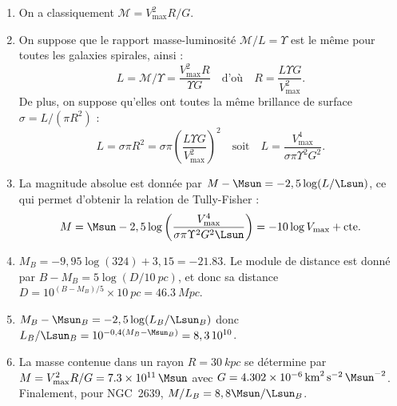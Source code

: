 \documentclass[a4paper,10pt]{report}
\begin{document}
\begin{Answer}
  \begin{enumerate}
  \item On a classiquement $\mathcal{M} = V_{\max}^{2}R/G$.
  \item On suppose que le rapport masse-luminosité $\mathcal{M}/L = \Upsilon$
    est le même pour toutes les galaxies spirales, ainsi :
    $$
    L = \mathcal{M} / \Upsilon = \frac{V_{\max}^{2}R}{\Upsilon G}
    \quad\text{d'où}\quad
    R = \frac{L \Upsilon G}{V_{\max}^{2}}.
    $$
    De plus, on suppose qu’elles ont toutes la même brillance de surface
    $\sigma = L/(\pi R^{2})$ :
    $$
    L = \sigma \pi R^{2} = 
    \sigma \pi \left(\frac{L \Upsilon G}{V_{\max}^{2}}\right)^{2}
    \quad\text{soit}\quad
    L = \frac{V_{\max}^{4}}{\sigma \pi \Upsilon^{2} G^{2}}.
    $$
  \item La magnitude absolue est donnée par $M - \Msun = -2,5\log(L/\Lsun)$, ce
    qui permet d’obtenir la relation de Tully-Fisher :
    $$
    M = \Msun - 2,5\log \left( \frac{V_{\max}^{4}}{\sigma \pi \Upsilon^{2}
        G^{2} \Lsun} \right) = -10\log V_{\max} + \mathrm{cte}.
    $$
  \item $M_{B} = -9,95 \log(324) + 3,15 = -21.83$. Le module de distance est
    donné par $B - M_{B} = 5\log(D/\SI{10}{pc})$, et donc sa
    distance $D = 10^{(B - M_{B})/5}\times\SI{10}{pc} = \SI{46,3}{Mpc}$.
  \item $M_{B} - \Msun_{B} = -2,5\log(L_{B}/\Lsun_{B})$ donc
    $L_{B}/\Lsun_{B} = 10^{-0,4(M_{B} - \Msun_{B})} = 8,3\,10^{10}$.
  \item La masse contenue dans un rayon $R = \SI{30}{kpc}$ se détermine par
    $M = V_{\max}^{2}R/G = \SI{7.3e11}{\Msun}$ avec
    $G = \SI{4.302e-6}{km^{2}.s^{-2}.\Msun^{-2}}$. Finalement, pour NGC~2639,
    $M/L_{B} = 8,8 \Msun/\Lsun_{B}$.
  \end{enumerate}
\end{Answer}
\end{document}
